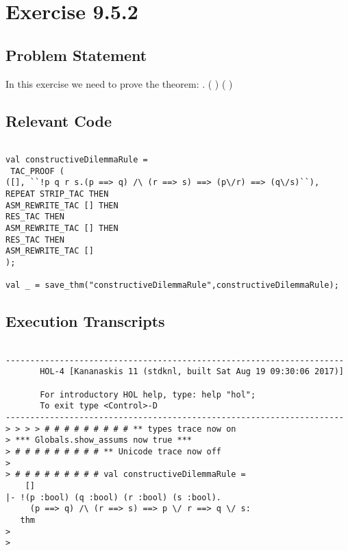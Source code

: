\documentclass{report}
\begin{document}

 \chapter{Exercise 9.5.2}
 \label{cha:exercise-9.5.2}
  
 \section{Problem Statement}
 \label{sec:problem-statement-2}

In this exercise we need to prove the theorem:
\HOLTokenTurnstile{} \HOLSymConst{\HOLTokenForall{}}   . ( \HOLSymConst{\HOLTokenImp{}} ) \HOLSymConst{\HOLTokenConj{}} ( \HOLSymConst{\HOLTokenImp{}} ) \HOLSymConst{\HOLTokenImp{}}  \HOLSymConst{\HOLTokenDisj{}}  \HOLSymConst{\HOLTokenImp{}}  \HOLSymConst{\HOLTokenDisj{}} 

\section{Relevant Code}
\label{sec:relevant-code-2}
 \lstset{frameround=fftt}
\begin{lstlisting}[frame=tRBL]

val constructiveDilemmaRule =
 TAC_PROOF (
([], ``!p q r s.(p ==> q) /\ (r ==> s) ==> (p\/r) ==> (q\/s)``),
REPEAT STRIP_TAC THEN
ASM_REWRITE_TAC [] THEN
RES_TAC THEN
ASM_REWRITE_TAC [] THEN
RES_TAC THEN
ASM_REWRITE_TAC []
);

val _ = save_thm("constructiveDilemmaRule",constructiveDilemmaRule);

\end{lstlisting}


\section{Execution Transcripts}
\label{sec:exec-transcr-2}

\setcounter{sessioncount}{0}
\begin{session}
  \begin{scriptsize}
\begin{verbatim}

---------------------------------------------------------------------
       HOL-4 [Kananaskis 11 (stdknl, built Sat Aug 19 09:30:06 2017)]

       For introductory HOL help, type: help "hol";
       To exit type <Control>-D
---------------------------------------------------------------------
> > > > # # # # # # # # # ** types trace now on
> *** Globals.show_assums now true ***
> # # # # # # # # # ** Unicode trace now off
> 
> # # # # # # # # # val constructiveDilemmaRule =
    []
|- !(p :bool) (q :bool) (r :bool) (s :bool).
     (p ==> q) /\ (r ==> s) ==> p \/ r ==> q \/ s:
   thm
> 
> 

\end{verbatim}
  \end{scriptsize}
\end{session}
\end{document}
